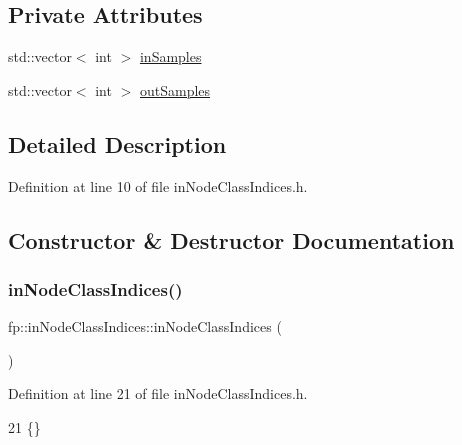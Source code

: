 \subsection*{Private Attributes}
\begin{DoxyCompactItemize}
\item 
std\+::vector$<$ int $>$ \hyperlink{classfp_1_1inNodeClassIndices_ae830eec1ee5490f4fe4fb3d579ac78eb}{in\+Samples}
\item 
std\+::vector$<$ int $>$ \hyperlink{classfp_1_1inNodeClassIndices_afaa76dfa346ba9de197b1cbd7a1557f9}{out\+Samples}
\end{DoxyCompactItemize}


\subsection{Detailed Description}


Definition at line 10 of file in\+Node\+Class\+Indices.\+h.



\subsection{Constructor \& Destructor Documentation}
\mbox{\label{classfp_1_1inNodeClassIndices_acc461b0620f39dfc6336313993c808fb}} 
\subsubsection{\texorpdfstring{in\+Node\+Class\+Indices()}{inNodeClassIndices()}\hspace{0.1cm}{\footnotesize\ttfamily [1/2]}}
{\footnotesize\ttfamily fp\+::in\+Node\+Class\+Indices\+::in\+Node\+Class\+Indices (\begin{DoxyParamCaption}{ }\end{DoxyParamCaption})\hspace{0.3cm}{\ttfamily [inline]}}



Definition at line 21 of file in\+Node\+Class\+Indices.\+h.


\begin{DoxyCode}
21 \{\}
\end{DoxyCode}
\mbox{\label{classfp_1_1inNodeClassIndices_a2b73531fc84c16ad3789af7307fb8688}} 
